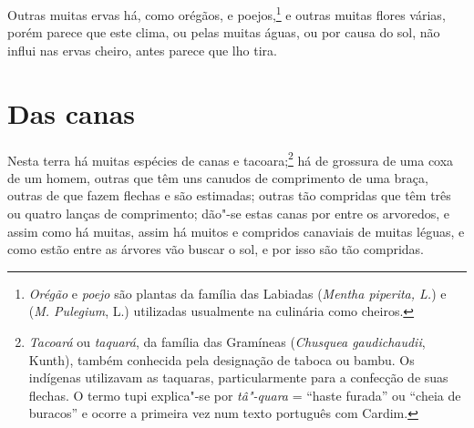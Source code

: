  Outras muitas ervas há, como orégãos, e poejos,\footnote{ \textit{Orégão} 
e \textit{poejo} são plantas da família das Labiadas
(\textit{Mentha piperita, L.}) e (\textit{M. Pulegium}, L.) utilizadas
usualmente na culinária como cheiros.} e outras muitas flores várias,
porém parece que este clima, ou pelas muitas águas, ou por causa do
sol, não influi nas ervas cheiro, antes parece que lho tira.

\section{Das canas}
Nesta terra há muitas espécies de canas e tacoara;\footnote{ \textit{Tacoará} 
ou \textit{taquará}, da família das Gramíneas
(\textit{Chusquea gaudichaudii}, Kunth), também conhecida pela
designação de taboca ou bambu. Os indígenas utilizavam as taquaras,
particularmente para a confecção de suas flechas. O termo tupi
explica"-se por \textit{tâ"-quara} = ``haste furada'' ou ``cheia de buracos''
e ocorre a primeira vez num texto português com Cardim.} há de grossura
de uma coxa de um homem, outras que têm uns canudos de comprimento de
uma braça, outras de que fazem flechas e são estimadas; outras tão
compridas que têm três ou quatro lanças de comprimento; dão"-se estas
canas por entre os arvoredos, e assim como há muitas, assim há muitos e
compridos canaviais de muitas léguas, e como estão entre as árvores vão
buscar o sol, e por isso são tão compridas.

